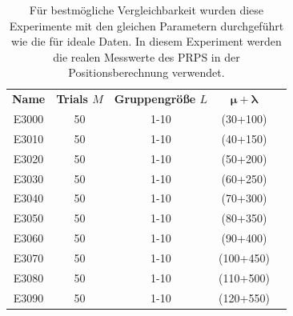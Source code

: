 \begin{table} [ht!]	
	\caption[Experimente - Reale Messdaten]{Für bestmögliche Vergleichbarkeit wurden diese Experimente mit den gleichen Parametern durchgeführt wie die für ideale Daten. In diesem Experiment werden die realen Messwerte des PRPS in der Positionsberechnung verwendet. }
		\label{tab:experiments2}
	\begin{center}
		\begin{tabular}{ccccc}
			\textbf{Name} 	& \textbf{Trials $M$} 	& \textbf{Gruppengröße $L$} & \textbf{$\mathbf{\mu}+\mathbf{\lambda}$}\\
			E3000			& 50 				&    1-10		&  (30+100) \\
			E3010			& 50 				&    1-10		&  (40+150) \\
			E3020			& 50 				&    1-10		&  (50+200) \\
			E3030			& 50 				&    1-10		&  (60+250) \\
			E3040			& 50 				&    1-10		&  (70+300) \\			                        
			E3050			& 50 				&    1-10		&  (80+350) \\			                        
			E3060			& 50 				&    1-10		&  (90+400) \\			                        
			E3070			& 50 				&    1-10		&  (100+450) \\			                        
			E3080			& 50 				&    1-10		&  (110+500) \\			                        
			E3090			& 50 				&    1-10		&  (120+550) \\			                        
%			
		\end{tabular}
	\end{center}
\end{table}
%
%

